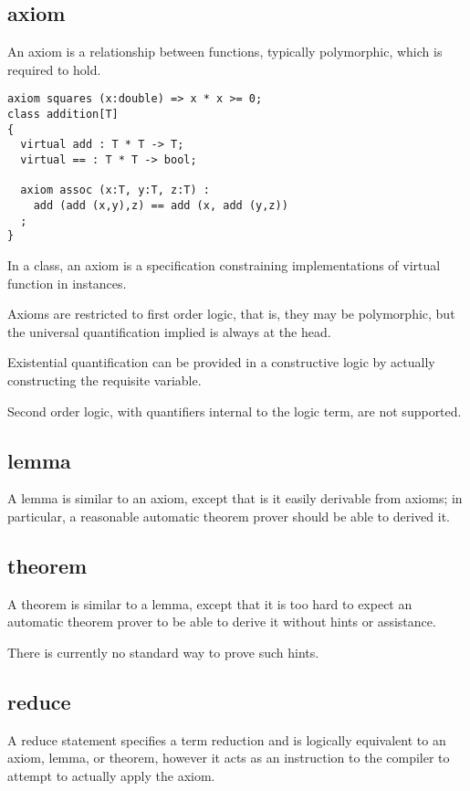 \documentclass[oneside]{book}
\begin{document}
\subsection{axiom}
An axiom is a relationship between functions, typically
polymorphic, which is required to hold.

\begin{verbatim}
axiom squares (x:double) => x * x >= 0;
class addition[T]
{
  virtual add : T * T -> T;
  virtual == : T * T -> bool;

  axiom assoc (x:T, y:T, z:T) : 
    add (add (x,y),z) == add (x, add (y,z))
  ;
}
\end{verbatim}

In a class, an axiom is a specification constraining
implementations of virtual function in instances.

Axioms are restricted to first order logic, that is, they
may be polymorphic, but the universal quantification implied
is always at the head.

Existential quantification can be provided in a constructive
logic by actually constructing the requisite variable.

Second order logic, with quantifiers internal to the 
logic term, are not supported.

\subsection{lemma}
A lemma is similar to an axiom, except that is it
easily derivable from axioms; in particular,
a reasonable automatic theorem prover should
be able to derived it.

\subsection{theorem}
A theorem is similar to a lemma, except that it is 
too hard to expect an automatic theorem prover
to be able to derive it without hints or assistance.

There is currently no standard way to prove such hints.

\subsection{reduce}
A reduce statement specifies a term reduction and is logically
equivalent to an axiom, lemma, or theorem, however it acts
as an instruction to the compiler to attempt to actually 
apply the axiom.
\end{document}
